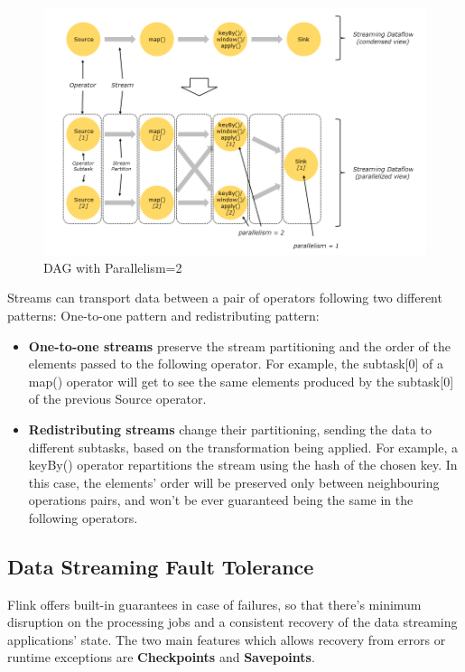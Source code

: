 \begin{figure}[ht]
    \centering
    \includegraphics{Figures/parallel_dataflow.png}
    \decoRule
    \caption[Parallel Dataflow]{DAG with Parallelism=2}
    \label{fig:ParallelDataflow}
\end{figure}

Streams can transport data between a pair of operators following two different patterns: One-to-one pattern and redistributing pattern:
\begin{itemize}
	\item \textbf{One-to-one streams} preserve the stream partitioning and the order of the elements passed to the following operator. For example, the subtask[0] of a map() operator will get to see the same elements produced by the subtask[0] of the previous Source operator.
   
    \item \textbf{Redistributing streams} change their partitioning, sending the data to different subtasks, based on the transformation being applied. For example, a keyBy() operator repartitions the stream using the hash of the chosen key. In this case, the elements' order will be preserved only between neighbouring operations pairs, and won't be ever guaranteed being the same in the following operators.
\end{itemize}

\subsection{Data Streaming Fault Tolerance}

Flink offers built-in guarantees in case of failures, so that there's minimum disruption on the processing jobs and a consistent recovery of the data streaming applications' state. The two main features which allows recovery from errors or runtime exceptions are \textbf{Checkpoints} and \textbf{Savepoints}.

